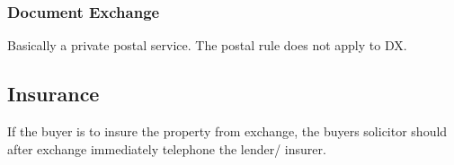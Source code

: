 \documentclass[
]{article}
\newenvironment{Shaded}{}{}
\newcommand{\NormalTok}[1]{#1}
\begin{document}
\hypertarget{document-exchange}{%
\subsubsection{Document Exchange}\label{document-exchange}}

Basically a private postal service. The postal rule does not apply to
DX.

\hypertarget{insurance-2}{%
\subsection{Insurance}\label{insurance-2}}

\begin{Shaded}
\begin{Highlighting}[]
\NormalTok{If the buyer is to insure the property from exchange, the buyer\textquotesingle{}s solicitor should after exchange immediately telephone the lender/ insurer. }
\end{Highlighting}
\end{Shaded}
\end{document}
